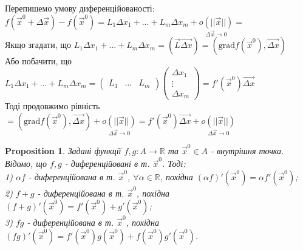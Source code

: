 \documentclass[a4paper, 10pt]{article}
\def\bigline{\vspace{5mm}\\}
\theoremstyle{theoremdd}
\theoremstyle{theoremdd}
\theoremstyle{theoremdd}
\theoremstyle{theoremdd}
\theoremstyle{theoremdd}
\theoremstyle{theoremdd}
\newtheorem{proposition}[theorem]{Proposition}
\theoremstyle{theoremdd}
\theoremstyle{theoremdd}
\theoremstyle{theoremdd}
\begin{document}
Перепишемо умову диференційованості:\\
$f(\vec{x}^0 + \Delta \vec{x}) - f(\vec{x}^0) = L_1 \Delta x_1 + \dots + L_m \Delta x_m + \underset{\Delta \vec{x} \to 0}{o(||\vec{x}||)} \boxed{=}$\\
Якщо згадати, що $L_1 \Delta x_1 + \dots + L_m \Delta x_m = \left( \overrightarrow{L} \overrightarrow{\Delta x} \right) = \left(\textrm{grad} f(\vec{x}^0), \overrightarrow{\Delta x}\right)$\\
Або побачити, що $L_1 \Delta x_1 + \dots + L_m \Delta x_m = \begin{pmatrix}
L_1 & \dots & L_m
\end{pmatrix} \begin{pmatrix}
\Delta x_1 \\ \vdots \\ \Delta x_m
\end{pmatrix} = f'(\vec{x}^0) \overrightarrow{\Delta x}$\\
Тоді продовжимо рівність\\
$\boxed{=} \left(\textrm{grad} f(\vec{x}^0), \overrightarrow{\Delta x}\right) + \underset{\Delta \vec{x} \to 0}{o(||\vec{x}||)} = f'(\vec{x}^0) \overrightarrow{\Delta x} + \underset{\Delta \vec{x} \to 0}{o(||\vec{x}||)}$
\bigline
\fi

\begin{proposition}
Задані функції $f,g: A \to \mathbb{R}$ та $\vec{x}^0 \in A$ - внутрішня точка. Відомо, що $f,g$ - диференційовані в т. $\vec{x}^0$. Тоді:\\
1) $\alpha f$ - диференційована в т. $\vec{x}^0$, $\forall \alpha \in \mathbb{R}$, похідна $(\alpha f)'(\vec{x}^0) = \alpha f'(\vec{x}^0)$;\\
2) $f + g$ - диференційована в т. $\vec{x}^0$, похідна $(f+g)'(\vec{x}^0) = f'(\vec{x}^0)+g'(\vec{x}^0)$;\\
3) $fg$ - диференційована в т. $\vec{x}^0$, похідна $(fg)'(\vec{x}^0) = f'(\vec{x}^0) g(\vec{x}^0) + f(\vec{x}^0)g'(\vec{x}^0)$.
\end{proposition}
\end{document}
